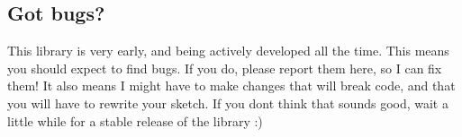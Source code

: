 \subsection*{Got bugs?}

This library is very early, and being actively developed all the time. This means you should expect to find bugs. If you do, please report them here, so I can fix them! It also means I might have to make changes that will break code, and that you will have to rewrite your sketch. If you don\textquotesingle{}t think that sounds good, wait a little while for a stable release of the library \+:) 